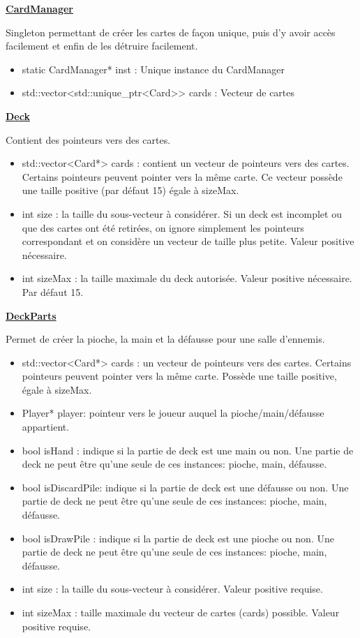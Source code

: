 \underline{\textbf{CardManager}}
\par Singleton permettant de créer les cartes de façon unique, puis d'y avoir accès facilement et enfin de les détruire facilement.
\begin{itemize}
    \item static CardManager* inst : Unique instance du CardManager
    \item std::vector<std::unique\_ptr<Card>> cards : Vecteur de cartes
\end{itemize}

\underline{\textbf{Deck}}
\par Contient des pointeurs vers des cartes. 
\begin{itemize}
    \item std::vector<Card*> cards : contient un vecteur de pointeurs vers des cartes. Certains pointeurs peuvent pointer vers la même carte. Ce vecteur possède une taille positive (par défaut 15) égale à sizeMax.
    \item int size : la taille du sous-vecteur à considérer. Si un deck est incomplet ou que des cartes ont été retirées, on ignore simplement les pointeurs correspondant et on considère un vecteur de taille plus petite. Valeur positive nécessaire.
    \item int sizeMax : la taille maximale du deck autorisée. Valeur positive nécessaire. Par défaut 15.
\end{itemize}

\underline{\textbf{DeckParts}}
\par Permet de créer la pioche, la main et la défausse pour une salle d'ennemis.

\begin{itemize}
    \item std::vector<Card*> cards : un vecteur de pointeurs vers des cartes. Certains pointeurs peuvent pointer vers la même carte. Possède une taille positive, égale à sizeMax.
    \item Player* player: pointeur vers le joueur auquel la pioche/main/défausse appartient.
    \item bool isHand : indique si la partie de deck est une main ou non. Une partie de deck ne peut être qu'une seule de ces instances: pioche, main, défausse.
    \item bool isDiscardPile: indique si la partie de deck est une défausse ou non. Une partie de deck ne peut être qu'une seule de ces instances: pioche, main, défausse.
    \item bool isDrawPile : indique si la partie de deck est une pioche ou non. Une partie de deck ne peut être qu'une seule de ces instances: pioche, main, défausse.
    \item int size : la taille du sous-vecteur à considérer. Valeur positive requise.
    \item int sizeMax : taille maximale du vecteur de cartes (cards) possible. Valeur positive requise.
\end{itemize}

